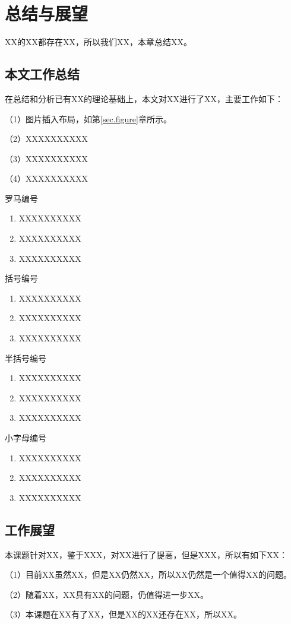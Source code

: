 \chapter{总结与展望}

XX的XX都存在XX，所以我们XX，本章总结XX。

\section{本文工作总结}
在总结和分析已有XX的理论基础上，本文对XX进行了XX，主要工作如下：

（1）图片插入布局，如第\ref{sec.figure}章所示。

（2）XXXXXXXXXX

（3）XXXXXXXXXX

（4）XXXXXXXXXX

罗马编号
\begin{enumerate}[label=(\roman*)]
 \item XXXXXXXXXX
 \item XXXXXXXXXX
 \item XXXXXXXXXX
\end{enumerate}
括号编号
\begin{enumerate}[label=(\arabic*)]
 \item XXXXXXXXXX
 \item XXXXXXXXXX
 \item XXXXXXXXXX
\end{enumerate}

半括号编号
\begin{enumerate}[label=\arabic*)]
 \item XXXXXXXXXX
 \item XXXXXXXXXX
 \item XXXXXXXXXX
\end{enumerate}

小字母编号
\begin{enumerate}[label=\alph*)]
 \item XXXXXXXXXX
 \item XXXXXXXXXX
 \item XXXXXXXXXX
\end{enumerate}
\section{工作展望}
本课题针对XX，鉴于XXX，对XX进行了提高，但是XXX，所以有如下XX：

（1）目前XX虽然XX，但是XX仍然XX，所以XX仍然是一个值得XX的问题。

（2）随着XX，XX具有XX的问题，仍值得进一步XX。

（3）本课题在XX有了XX，但是XX的XX还存在XX，所以XX。

